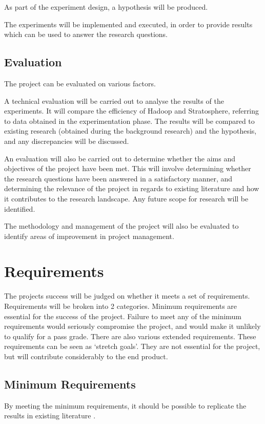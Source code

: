 As part of the experiment design, a hypothesis will be produced.

The experiments will be implemented and executed, in order to provide results which can be used to answer the research questions.

\subsection{Evaluation}
The project can be evaluated on various factors.

A technical evaluation will be carried out to analyse the results of the experiments. It will compare the efficiency of Hadoop and Stratosphere, referring to data obtained in the experimentation phase. The results will be compared to existing research (obtained during the background research) and the hypothesis, and any discrepancies will be discussed. 

An evaluation will also be carried out to determine whether the aims and objectives of the project have been met. This will involve determining whether the research questions have been answered in a satisfactory manner, and determining the relevance of the project in regards to existing literature and how it contributes to the research landscape. Any future scope for research will be identified. 

The methodology and management of the project will also be evaluated to identify areas of improvement in project management.

\section{Requirements}
The projects success will be judged on whether it meets a set of requirements. Requirements will be broken into 2 categories. Minimum requirements are essential for the success of the project. Failure to meet any of the minimum requirements would seriously compromise the project, and would make it unlikely to qualify for a pass grade. There are also various extended requirements. These requirements can be seen as `stretch goals'. They are not essential for the project, but will contribute considerably to the end product.

\subsection{Minimum Requirements}
By meeting the minimum requirements, it should be possible to replicate the results in existing literature \cite{warneke2011exploiting}. 

